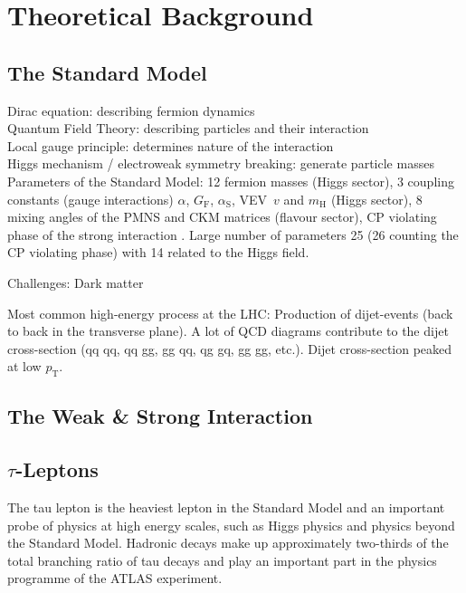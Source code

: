 \chapter{Theoretical Background}
\label{sec:theory}

\section{The Standard Model}

Dirac equation: describing fermion dynamics\\
Quantum Field Theory: describing particles and their interaction\\
Local gauge principle: determines nature of the interaction\\
Higgs mechanism / electroweak symmetry breaking: generate particle masses\\

Parameters of the Standard Model: 12 fermion masses (Higgs sector), 3 coupling
constants (gauge interactions) $\alpha$, $G_{\text{F}}$, $\alpha_{\text{S}}$,
VEV~$v$ and $m_{\text{H}}$ (Higgs sector), 8 mixing angles of the PMNS and CKM
matrices (flavour sector), CP violating phase of the strong interaction
\cite{thomson}.
Large number of parameters 25 (26 counting the CP violating phase) with 14
related to the Higgs field.

Challenges: Dark matter

Most common high-energy process at the LHC: Production of dijet-events (back to
back in the transverse plane). A lot of QCD diagrams contribute to the dijet
cross-section (qq \textrightarrow qq, qq \textrightarrow gg, gg \textrightarrow
qq, qg \textrightarrow gq, gg \textrightarrow gg, etc.). Dijet cross-section
peaked at low $p_{\text{T}}$.

\section{The Weak \& Strong Interaction}

\section{$\tau$-Leptons}

The tau lepton is the heaviest lepton in the Standard Model and an important
probe of physics at high energy scales, such as Higgs physics and physics beyond
the Standard Model. Hadronic decays make up approximately two-thirds of the
total branching ratio of tau decays and play an important part in the physics
programme of the ATLAS experiment.


